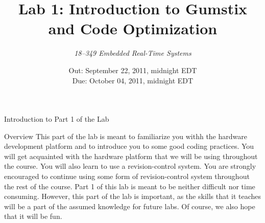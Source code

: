 \documentclass{article}
\title{\huge Lab 1: Introduction to Gumstix and Code Optimization}
\author{\Large\itshape 18--349 Embedded Real-Time Systems}
\date{
	Out: September 22, 2011, midnight EDT\\
	Due: October 04, 2011, midnight EDT \\
}
\begin{document}
	\maketitle

	\setcounter{tocdepth}{2}
	\tableofcontents
	\clearpage

	\begin{section}{Introduction to Part 1 of the Lab}
	\begin{subsection}{Overview} This part of the lab is meant to
	familiarize you withh the hardware development platform and to
	introduce you to some good coding practices.  You will get acquainted with the hardware
	platform that we will be using throughout the course.  You
	will also learn to use a revision-control system.  You are
	strongly encouraged to continue using some form of revision-control
	system throughout the rest of the course.  Part 1 of this lab
	is meant to be neither difficult nor time consuming.  However, 
	this part of the lab is important, as the skills that it teaches
	will be a part of the assumed knowledge for future labs.  Of course, we also
	hope that it will be fun.  \end{subsection}


\end{section}
\end{document}

